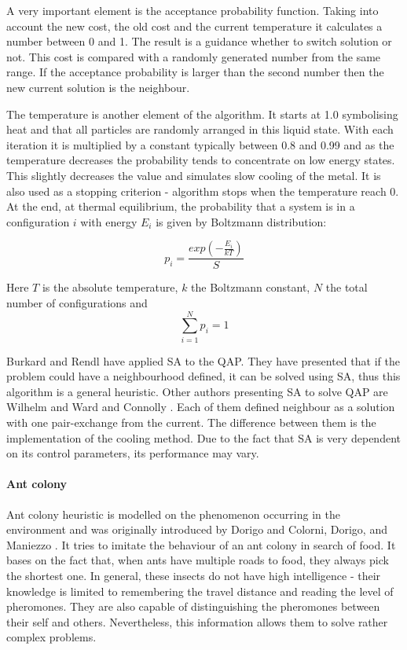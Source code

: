 A very important element is the acceptance probability function.
Taking into account the new cost, the old cost and the current temperature it calculates a number between 0 and 1.
The result is a guidance whether to switch solution or not.
This cost is compared with a randomly generated number from the same range.
If the acceptance probability is larger than the second number then the new current solution is the neighbour.

The temperature is another element of the algorithm.
It starts at 1.0 symbolising heat and that all particles are randomly arranged in this liquid state.
With each iteration it is multiplied by a constant typically between 0.8 and 0.99 and as the temperature decreases the probability tends to concentrate on low energy states.
This slightly decreases the value and simulates slow cooling of the metal.
It is also used as a stopping criterion - algorithm stops when the temperature reach 0.
At the end, at thermal equilibrium, the probability that a system is in a configuration $i$ with energy $E_i$ is given by Boltzmann distribution:

\begin{equation}
  p_i = \frac{exp(-\frac{E_i}{kT})}{S}
\end{equation}

Here $T$ is the absolute temperature, $k$ the Boltzmann constant, $N$ the total number of configurations and
\begin{equation}
  \sum_{i=1}^{N} p_i = 1
\end{equation}

Burkard and Rendl \cite{burkard1984thermodynamically} have applied SA to the QAP.
They have presented that if the problem could have a neighbourhood defined, it can be solved using SA, thus this algorithm is a general heuristic.
Other authors presenting SA to solve QAP are Wilhelm and Ward \cite{wilhelm1987solving} and Connolly \cite{connolly1990improved}.
Each of them defined neighbour as a solution with one pair-exchange from the current.
The difference between them is the implementation of the cooling method.
Due to the fact that SA is very dependent on its control parameters, its performance may vary.

\paragraph{Ant colony}

Ant colony heuristic is modelled on the phenomenon occurring in the environment and was originally introduced by Dorigo \cite{dorigo1992optimization} and Colorni, Dorigo, and Maniezzo \cite{dorigo1996ant}.
It tries to imitate the behaviour of an ant colony in search of food.
It bases on the fact that, when ants have multiple roads to food, they always pick the shortest one.
In general, these insects do not have high intelligence - their knowledge is limited to remembering the travel distance and reading the level of pheromones.
They are also capable of distinguishing the pheromones between their self and others.
Nevertheless, this information allows them to solve rather complex problems.

